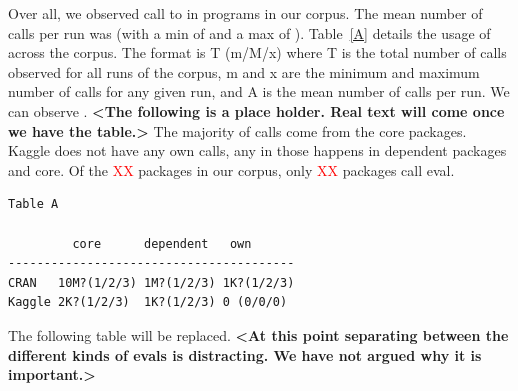\documentclass[conference]{IEEEtran}
\newcommand{\missingNumber}{\textcolor{red}{XX}\xspace}
\begin{document}
Over all, we observed \AllAllCallCountRnd call to \eval in \CorpusAllProgramsRnd
programs in our corpus. The mean number of calls per run was  (with a
min of  and a max of ). Table~\ref{A} details the usage of
\eval across the corpus. The format is T (m/M/x) where T is the total number of
calls observed for all runs of the corpus, m and x are the minimum and maximum
number of calls for any given run, and A is the mean number of calls per run. We
can observe . {\bf <The following is a place holder. Real text will
  come once we have the table.>} The majority of calls come from the core
packages. Kaggle does not have any own calls, any \eval in those happens in
dependent packages and core. Of the \missingNumber packages in our corpus, only
\missingNumber packages call eval.


\begin{verbatim}
Table A

         core      dependent   own
----------------------------------------
CRAN   10M?(1/2/3) 1M?(1/2/3) 1K?(1/2/3)
Kaggle 2K?(1/2/3)  1K?(1/2/3) 0 (0/0/0)
\end{verbatim}

\begin{table}[ht]
  \label{table:source-eval-summary}
  \caption{Distribution of eval calls in CRAN and Kaggle}
\end{table}



The following table will be replaced. {\bf <At this point separating between
  the different kinds of evals is distracting. We have not argued why it is
  important.>}
\end{document}
